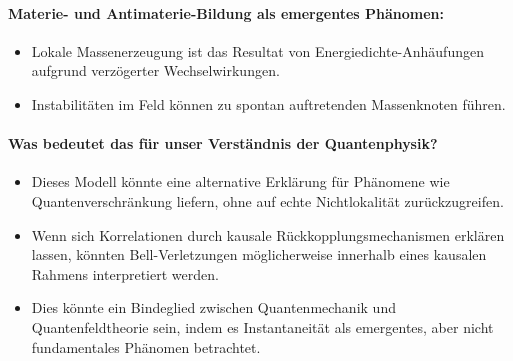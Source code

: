 \documentclass[a4paper,11pt]{article}
\begin{document}
	\paragraph{Materie- und Antimaterie-Bildung als emergentes Phänomen:}
	\begin{itemize}
		\item Lokale Massenerzeugung ist das Resultat von Energiedichte-Anhäufungen aufgrund verzögerter Wechselwirkungen.
		\item Instabilitäten im Feld können zu spontan auftretenden Massenknoten führen.
	\end{itemize}
	
	\paragraph{Was bedeutet das für unser Verständnis der Quantenphysik?}
	\begin{itemize}
		\item Dieses Modell könnte eine alternative Erklärung für Phänomene wie Quantenverschränkung liefern, ohne auf echte Nichtlokalität zurückzugreifen.
		\item Wenn sich Korrelationen durch kausale Rückkopplungsmechanismen erklären lassen, könnten Bell-Verletzungen möglicherweise innerhalb eines kausalen Rahmens interpretiert werden.
		\item Dies könnte ein Bindeglied zwischen Quantenmechanik und Quantenfeldtheorie sein, indem es Instantaneität als emergentes, aber nicht fundamentales Phänomen betrachtet.
	\end{itemize}
	
\end{document}

